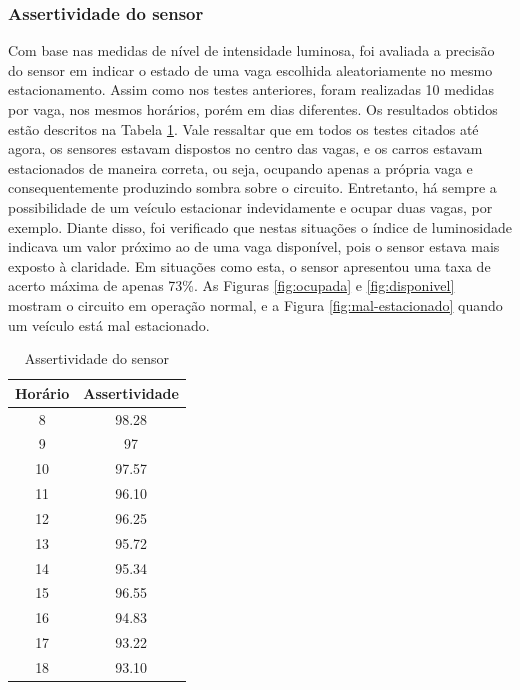 \documentclass[oneside,openright,12pt]{ufsm_2015} %
\begin{document}
    \subsubsection{Assertividade do sensor}
    Com base nas medidas de nível de intensidade luminosa, foi avaliada a precisão do sensor em indicar o estado de uma vaga escolhida aleatoriamente no mesmo estacionamento. Assim como nos testes anteriores, foram realizadas 10 medidas por vaga, nos mesmos horários, porém em dias diferentes. Os resultados obtidos estão descritos na Tabela \ref{table:assertividade-ldr}. Vale ressaltar que em todos os testes citados até agora, os sensores estavam dispostos no centro das vagas, e os carros estavam estacionados de maneira correta, ou seja, ocupando apenas a própria vaga e consequentemente produzindo sombra sobre o circuito. Entretanto, há sempre a possibilidade de um veículo estacionar indevidamente e ocupar duas vagas, por exemplo. Diante disso, foi verificado que nestas situações o índice de luminosidade indicava um valor próximo ao de uma vaga disponível, pois o sensor estava mais exposto à claridade. Em situações como esta, o sensor apresentou uma taxa de acerto máxima de apenas 73\%. As Figuras \ref{fig:ocupada} e \ref{fig:disponivel} mostram o circuito em operação normal, e a Figura \ref{fig:mal-estacionado} quando um veículo está mal estacionado.
    
    \begin{table}[ht]
         \centering
         \caption{Assertividade do sensor}
         \begin{tabular}{ c c }
             \hline
              Horário & Assertividade \\ 
             \hline
             8 & 98.28\\
             \hline
             9 & 97\\
             \hline
             10 & 97.57\\
             \hline
             11 & 96.10\\
             \hline
             12 & 96.25\\
             \hline
             13 & 95.72\\
             \hline
             14 & 95.34\\
             \hline
             15 & 96.55\\
             \hline
             16 & 94.83\\
             \hline
             17 & 93.22\\
             \hline
             18 & 93.10\\
             \hline
         \end{tabular}
         \vspace{\baselineskip} %
          \label{table:assertividade-ldr}
    \end{table}
    
\end{document}

